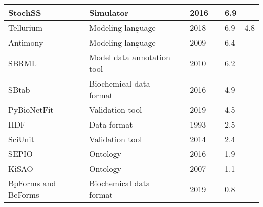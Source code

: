 \begin{longtable}{L{2.2cm}L{4cm}L{1cm}L{0.8cm}R{1.1cm}R{1cm}R{1cm}}
\midrule
\small{StochSS} &\small{Simulator} &\cite{drawert2016stochastic} &\small{2016} &\small{} &\small{6.9} &\small{}\\
\midrule
\small{Tellurium} &\small{Modeling language} &\cite{Choi2018Tellurium:Biology} &\small{2018} &\small{} &\small{6.9} &\small{4.8}\\
\midrule
\small{Antimony} &\small{Modeling language} &\cite{Smith2009Antimony:Language} &\small{2009} &\small{} &\small{6.4} &\small{}\\
\midrule
\small{SBRML} &\small{Model data annotation tool} &\cite{Dada2010SBRML:Models} &\small{2010} &\small{} &\small{6.2} &\small{}\\
\midrule
\small{SBtab} &\small{Biochemical data format} &\cite{Lubitz2016SBtab:Biology} &\small{2016} &\small{} &\small{4.9} &\small{}\\
\midrule
\small{PyBioNetFit} &\small{Validation tool} &\cite{Mitra2019PyBioNetFitLanguage} &\small{2019} &\small{} &\small{4.5} &\small{}\\
\midrule
\small{HDF} &\small{Data format} &\cite{Brown1993SoftwareManagement} &\small{1993} &\small{} &\small{2.5} &\small{}\\
\midrule
\small{SciUnit} &\small{Validation tool} &\cite{Omar2014CollaborativeValidation} &\small{2014} &\small{} &\small{2.4} &\small{}\\
\midrule
\small{SEPIO} &\small{Ontology} &\cite{Brush2016SEPIO:Evidence} &\small{2016} &\small{} &\small{1.9} &\small{}\\
\midrule
\small{KiSAO} &\small{Ontology} &\cite{Zhukova2011KineticOntology} &\small{2007} &\small{} &\small{1.1} &\small{}\\
\midrule
\small{BpForms and BcForms} &\small{Biochemical data format} &\cite{Lang2019BpForms:Proteins} &\small{2019} &\small{} &\small{0.8} &\small{}\\
\bottomrule\end{longtable}
